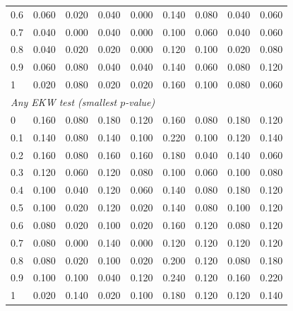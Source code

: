 \begin{table}[htbp]
\begin{tabular}{lcccccccc}
0.6 & 0.060 & 0.020 & 0.040 & 0.000 & 0.140 & 0.080 & 0.040 & 0.060 \\
0.7 & 0.040 & 0.000 & 0.040 & 0.000 & 0.100 & 0.060 & 0.040 & 0.060 \\
0.8 & 0.040 & 0.020 & 0.020 & 0.000 & 0.120 & 0.100 & 0.020 & 0.080 \\
0.9 & 0.060 & 0.080 & 0.040 & 0.040 & 0.140 & 0.060 & 0.080 & 0.120 \\
1 & 0.020 & 0.080 & 0.020 & 0.020 & 0.160 & 0.100 & 0.080 & 0.060 \\
\midrule
\multicolumn{9}{l}{\textit{Any EKW test (smallest $p$-value)}} \\
0 & 0.160 & 0.080 & 0.180 & 0.120 & 0.160 & 0.080 & 0.180 & 0.120 \\
0.1 & 0.140 & 0.080 & 0.140 & 0.100 & 0.220 & 0.100 & 0.120 & 0.140 \\
0.2 & 0.160 & 0.080 & 0.160 & 0.160 & 0.180 & 0.040 & 0.140 & 0.060 \\
0.3 & 0.120 & 0.060 & 0.120 & 0.080 & 0.100 & 0.060 & 0.100 & 0.080 \\
0.4 & 0.100 & 0.040 & 0.120 & 0.060 & 0.140 & 0.080 & 0.180 & 0.120 \\
0.5 & 0.100 & 0.020 & 0.120 & 0.020 & 0.140 & 0.080 & 0.100 & 0.120 \\
0.6 & 0.080 & 0.020 & 0.100 & 0.020 & 0.160 & 0.120 & 0.080 & 0.120 \\
0.7 & 0.080 & 0.000 & 0.140 & 0.000 & 0.120 & 0.120 & 0.120 & 0.120 \\
0.8 & 0.080 & 0.020 & 0.100 & 0.020 & 0.200 & 0.120 & 0.080 & 0.180 \\
0.9 & 0.100 & 0.100 & 0.040 & 0.120 & 0.240 & 0.120 & 0.160 & 0.220 \\
1 & 0.020 & 0.140 & 0.020 & 0.100 & 0.180 & 0.120 & 0.120 & 0.140 \\
\bottomrule
\end{tabular}
\par\smallskip

\end{table}
